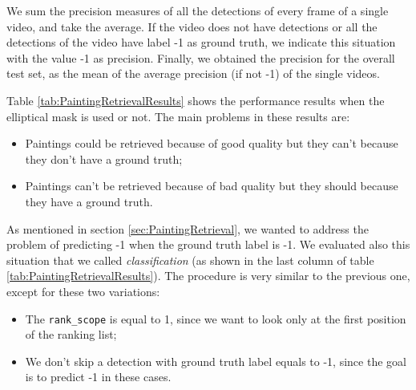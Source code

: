 \documentclass[10pt,twocolumn,letterpaper]{article}
\begin{document}
We sum the precision measures of all the detections of every frame of a single video, and take the average. If the video does not have detections or all the detections of the video have label -1 as ground truth, we indicate this situation with the value -1 as precision. Finally, we obtained the precision for the overall test set, as the mean of the average precision (if not -1) of the single videos.

Table \ref{tab:PaintingRetrievalResults} shows the performance results when the elliptical mask is used or not. The main problems in these results are:
\begin{itemize}
    \item Paintings could be retrieved because of good quality but they can't because they don't have a ground truth;
    \item Paintings can't be retrieved because of bad quality but they should because they have a ground truth.
\end{itemize}

As mentioned in section \ref{sec:PaintingRetrieval}, we wanted to address the problem of predicting -1 when the ground truth label is -1. We evaluated also this situation that we called \textit{classification} (as shown in the last column of table \ref{tab:PaintingRetrievalResults}). The procedure is very similar to the previous one, except for these two variations:
\begin{itemize}
    \item The \texttt{rank\_scope} is equal to 1, since we want to look only at the first position of the ranking list;
    \item We don't skip a detection with ground truth label equals to -1, since the goal is to predict -1 in these cases.
\end{itemize}
\end{document}

